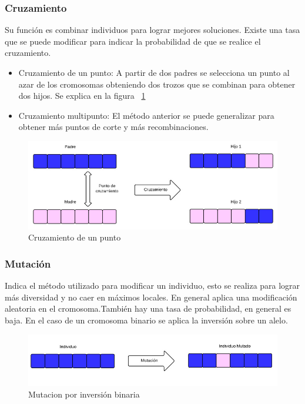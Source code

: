 \subsubsection{Cruzamiento}
Su función es combinar individuos para lograr mejores soluciones. 
Existe una tasa que se puede modificar para indicar la probabilidad de que se realice el cruzamiento.

\begin{itemize}
	\item Cruzamiento de un punto: A partir de dos padres se selecciona un punto al azar de los cromosomas obteniendo dos trozos que se combinan para obtener dos hijos. Se explica en la figura ~\ref{fig:cruzamiento1}
	\item Cruzamiento multipunto: El método anterior se puede generalizar para obtener más puntos de corte y más recombinaciones.
\end{itemize}

\begin{figure}[h]
	\centering
	\includegraphics[width=\textwidth]{Figures/cruzamiento1}
	\caption{Cruzamiento de un punto}
	\label{fig:cruzamiento1}
\end{figure}

\subsubsection{Mutación} 
Indica el método utilizado para modificar un individuo, esto se realiza para lograr más diversidad y no caer en máximos locales. En general aplica una modificación aleatoria en el cromosoma.También hay una tasa de probabilidad, en general es baja. En el caso de un cromosoma binario se aplica la inversión sobre un alelo.

\begin{figure}[h]
	\centering
	\includegraphics[width=1\linewidth]{Figures/mutacion1}
	\caption{Mutacion por inversión binaria}
	\label{fig:mutacion1}
\end{figure}


